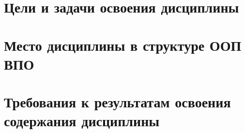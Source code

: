 






\section{Цели и задачи освоения дисциплины}


\section{Место дисциплины в структуре ООП ВПО}



\section{Требования к результатам освоения содержания дисциплины}

